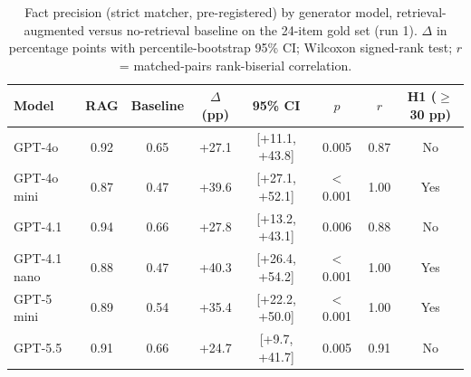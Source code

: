 \begin{table}[H]
\centering
\caption{Fact precision (strict matcher, pre-registered) by generator model, retrieval-augmented versus no-retrieval baseline on the 24-item gold set (run 1). $\Delta$ in percentage points with percentile-bootstrap 95\% CI; Wilcoxon signed-rank test; $r$ = matched-pairs rank-biserial correlation.}
\label{tab:multimodel-strict}
{\footnotesize{}\setlength{\tabcolsep}{4pt}
\begin{tabular}{lccccccc}
\toprule
\textbf{Model} & \textbf{RAG} & \textbf{Baseline} & \textbf{$\Delta$ (pp)} & \textbf{95\% CI} & \textbf{$p$} & \textbf{$r$} & \textbf{H1 ($\geq$30 pp)} \\
\midrule
GPT-4o & 0.92 & 0.65 & +27.1 & [+11.1, +43.8] & 0.005 & 0.87 & No \\
GPT-4o mini & 0.87 & 0.47 & +39.6 & [+27.1, +52.1] & $<$0.001 & 1.00 & Yes \\
GPT-4.1 & 0.94 & 0.66 & +27.8 & [+13.2, +43.1] & 0.006 & 0.88 & No \\
GPT-4.1 nano & 0.88 & 0.47 & +40.3 & [+26.4, +54.2] & $<$0.001 & 1.00 & Yes \\
GPT-5 mini & 0.89 & 0.54 & +35.4 & [+22.2, +50.0] & $<$0.001 & 1.00 & Yes \\
GPT-5.5 & 0.91 & 0.66 & +24.7 & [+9.7, +41.7] & 0.005 & 0.91 & No \\
\bottomrule
\end{tabular}
}
\end{table}
